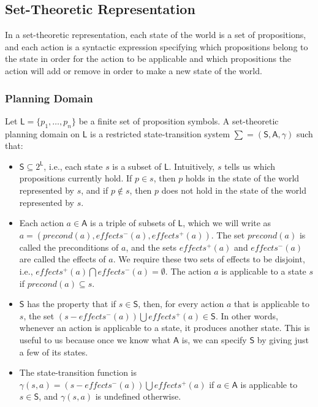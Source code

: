\subsection{Set-Theoretic Representation}
In a set-theoretic representation, each state of the world is a set of propositions, and each action is a syntactic expression specifying which propositions belong to the state in order for the action to be applicable and which propositions the action will add or remove in order to make a new state of the world.

\subsubsection{Planning Domain}
\begin{defn}Let $\mathsf{L}=\lbrace p_1,\dots,p_n\rbrace$ be a finite set of proposition symbols. A set-theoretic
planning domain on $\mathsf{L}$ is a restricted state-transition system $\sum = (\mathsf{S},\mathsf{A},\gamma)$ such
that:
\begin{itemize}
\item $\mathsf{S}\subseteq 2^{\mathsf{L}}$, i.e., each state $s$ is a subset of $\mathsf{L}$. Intuitively, $s$ tells us which propositions currently hold. If $p\in s$, then $p$ holds in the state of the world represented by
$s$, and if $p\notin s$, then $p$ does not hold in the state of the world represented by $s$.
\item Each action $a\in \mathsf{A}$ is a triple of subsets of $\mathsf{L}$, which we will write as
$a = (precond(a), effects^{-}(a), effects ^{+}(a))$. The set $precond(a)$ is called the preconditions
of $a$, and the sets $effects^{+}(a)$ and $effects^{-}(a)$ are called the effects
of $a$. We require these two sets of effects to be disjoint, i.e., $effects^{+} (a)\bigcap
effects^{-}(a)=  \emptyset$. The action $a$ is applicable to a state $s$ if $precond(a)\subseteq s$.
\item $\mathsf{S}$ has the property that if $s\in \mathsf{S}$, then, for every action $a$ that is applicable
to $s$, the set $(s - effects^{-}(a)) \bigcup effects^{+}(a)\in \mathsf{S}$. In other words, whenever an
action is applicable to a state, it produces another state. This is useful to us
because once we know what $\mathsf{A}$ is, we can specify $\mathsf{S}$ by giving just a few of its
states.
\item The state-transition function is $\gamma(s,a)=(s - effects^{-}(a))\bigcup effects^{+}(a)$ if
$a\in \mathsf{A}$ is applicable to $s\in \mathsf{S}$, and $\gamma(s,a)$ is undefined otherwise.
\end{itemize}
\end{defn}

